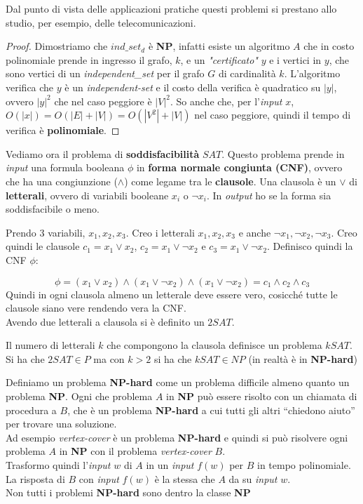 Dal punto di vista delle applicazioni pratiche questi problemi si prestano allo
studio, per esempio, delle telecomunicazioni.
\begin{proof}
  Dimostriamo che $ind\_set_d$ è \textbf{NP}, infatti esiste un algoritmo $A$
  che in costo polinomiale prende in ingresso il grafo, $k$, e un
  \textit{"certificato"} $y$ e i vertici in $y$, che sono vertici di un
  \textit{independent\_set} per il grafo $G$ di cardinalità $k$. L'algoritmo
  verifica che $y$ è un \textit{independent-set} e il costo della verifica è
  quadratico su $|y|$, ovvero $|y|^2$ che nel caso peggiore è $|V|^2$. So anche
  che, per l'\textit{input} $x$, $O(|x|)=O(|E|+|V|)=O(|V^2|+|V|)$ nel caso peggiore,
  quindi il tempo di verifica è \textbf{polinomiale}.
\end{proof}
\begin{definizione}
  Vediamo ora il problema di \textbf{soddisfacibilità} $SAT$. Questo problema
  prende in \textit{input} una formula booleana $\phi$ in \textbf{forma normale congiunta
    (CNF)}, ovvero che ha una congiunzione ($\land$) come legame tra le
  \textbf{clausole}. Una clausola è un $\lor$ di \textbf{letterali}, ovvero di
  variabili booleane $x_i$ o $\neg x_i$. In \textit{output} ho se la forma sia
  soddisfacibile o meno. 
  \begin{esempio}
    Prendo 3 variabili, $x_1,x_2,x_3$. Creo i letterali  $x_1,x_2,x_3$ e anche
    $\neg x_1,\neg x_2,\neg x_3$. Creo quindi le clausole $c_1=x_1\lor x_2$,
    $c_2=x_1\lor \neg x_2$ e $c_3=x_1\lor \neg x_2$. Definisco quindi la CNF
    $\phi$:
    
    \[\phi=(x_1\lor x_2)\land (x_1\lor \neg x_2)\land
      (x_1\lor \neg x_2)=c_1\land c_2\land c_3\]
    Quindi in ogni clausola almeno un letterale deve essere vero, cosicché tutte
    le clausole siano vere rendendo vera la CNF.\\
    Avendo due letterali a clausola si è definito un $2SAT$.
  \end{esempio}
  Il numero di letterali $k$ che compongono la clausola definisce un problema
  $kSAT$. Si ha che $2SAT\in P$ ma con $k>2$ si ha che $kSAT\in NP$ (in
  realtà è in \textbf{NP-hard})
\end{definizione}
\begin{definizione}
  Definiamo un problema \textbf{NP-hard} come un problema difficile almeno
  quanto un problema \textbf{NP}. Ogni che problema $A$ in \textbf{NP} può
  essere risolto con un chiamata di procedura a $B$, che è un problema
  \textbf{NP-hard} a cui tutti gli altri ``chiedono aiuto'' per trovare una
  soluzione. \\
  Ad esempio \textit{vertex-cover} è un problema \textbf{NP-hard} e quindi si può
  risolvere ogni problema $A$ in \textbf{NP} con il problema
  \textit{vertex-cover} $B$.\\
  Trasformo quindi l'\textit{input} $w$ di $A$ in un \textit{input}
  $f(w)$ per $B$ in tempo polinomiale. La risposta di $B$ con \textit{input} $f(w)$ è la
  stessa che $A$ da su \textit{input} $w$.\\
  Non tutti i problemi \textbf{NP-hard} sono dentro la classe \textbf{NP}
\end{definizione}
